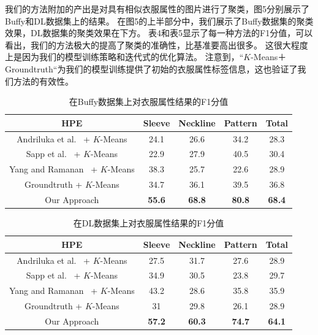 我们的方法附加的产出是对具有相似衣服属性的图片进行了聚类，图5分别展示了Buffy和DL数据集上的结果。
在图5的上半部分中，我们展示了Buffy数据集的聚类效果，DL数据集的聚类效果在下方。
表4和表5显示了每一种方法的F1分值，可以看出，我们的方法极大的提高了聚类的准确性，比基准要高出很多。
这很大程度上是因为我们的模型训练策略和迭代式的优化算法。
注意到，“$K$-Means＋Groundtruth“为我们的模型训练提供了初始的衣服属性标签信息，这也验证了我们方法的有效性。

\begin{table}
\centering
\caption{在Buffy数据集上对衣服属性结果的F1分值}
\begin{tabular}{|c|c|c|c|c|} \hline
    HPE & Sleeve & Neckline & Pattern & Total \\ \hline
Andriluka et al.~\cite{cvpr09} + $K$-Means & 24.1 & 26.6 & 34.2 & 28.3  \\ \hline
Sapp et al.~\cite{eccv10} + $K$-Means & 22.9 & 27.9 & 40.5 & 30.4 \\ \hline
Yang and Ramanan~\cite{deva11} + $K$-Means & 38.3 & 25.7 & 22.6 & 28.9\\ \hline
Groundtruth + $K$-Means & 34.7 & 36.1 & 39.5 & 36.8\\ \hline
Our Approach & \textbf{55.6} & \textbf{68.8} & \textbf{80.8} & \textbf{68.4}  \\ \hline
\end{tabular}
\label{tb:f1_buffy}
\end{table}


\begin{table}
\centering
\caption{在DL数据集上对衣服属性结果的F1分值}
\begin{tabular}{|c|c|c|c|c|} \hline
    HPE & Sleeve & Neckline & Pattern & Total \\ \hline
Andriluka et al.~\cite{cvpr09} + $K$-Means & 27.5 & 31.7 & 27.6 & 28.9  \\ \hline
Sapp et al.~\cite{eccv10} + $K$-Means & 34.9 & 30.5 & 23.8 & 29.7 \\ \hline
Yang and Ramanan~\cite{deva11} + $K$-Means & 43.2 & 28.6 & 35.8 & 35.9 \\ \hline
Groundtruth  + $K$-Means & 31 & 29.8 & 26.1 & 28.9 \\ \hline
Our Approach & \textbf{57.2} & \textbf{60.3} & \textbf{74.7} & \textbf{64.1}  \\ \hline
\end{tabular}
\label{tb:f1_dl}
\end{table}


